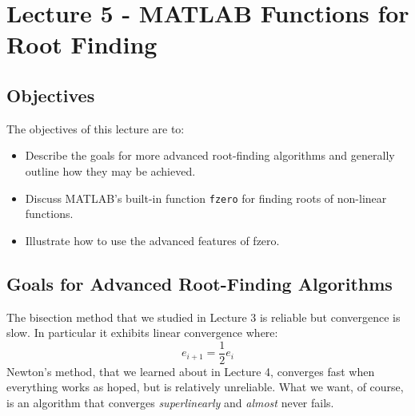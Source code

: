 \chapter{Lecture 5 - MATLAB Functions for Root Finding}
\label{ch:lec5n}
\section{Objectives}
The objectives of this lecture are to:
\begin{itemize}
\item Describe the goals for more advanced root-finding algorithms and generally outline how they may be achieved.
\item Discuss MATLAB's built-in function \lstinline[style=myMatlab]{fzero} for finding roots of non-linear functions.
\item Illustrate how to use the advanced features of fzero.
\end{itemize}
\setcounter{lstannotation}{0}

\section{Goals for Advanced Root-Finding Algorithms}

The bisection method that we studied in Lecture 3 is reliable but convergence is slow.  In particular it exhibits linear convergence where:
\begin{equation}
e_{i+1} = \frac{1}{2}e_{i}
\end{equation}
Newton's method, that we learned about in Lecture 4, converges fast when everything works as hoped, but is relatively unreliable.  What we want, of course, is an algorithm that converges \emph{superlinearly} and \emph{almost} never fails.

